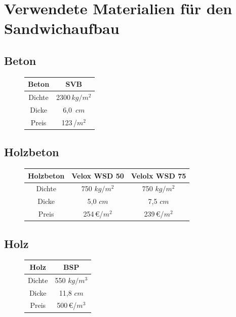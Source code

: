 \section{Verwendete Materialien für den Sandwichaufbau}

\subsection{Beton}

\begin{figure}[h!]
\begin{tabular}{|c|c|}
\hline 
Beton & SVB \\ 
\hline \hline
Dichte & 2300\,$ kg/m^{2}$ \\ 
\hline 
Dicke & 6,0\, $cm$ \\ 
\hline 
Preis & 123\,/$m^{2}$ \\ 
\hline 
\end{tabular} 
\end{figure}


\subsection{Holzbeton}

\begin{figure}[h!]
\begin{tabular}{|c|c|c|}
\hline 
Holzbeton & Velox WSD 50 & Velolx WSD 75 \\ 
\hline \hline
Dichte & 750 $ kg/m^{2}$ &750 $ kg/m^{2}$ \\ 
\hline 
Dicke & 5,0 $cm$ & 7,5 $cm$\\ 
\hline 
Preis & 254\,\euro/$m^{2}$ & 239\,\euro/$m^{2}$ \\ 
\hline 
\end{tabular} 
\end{figure}

\subsection{Holz}

\begin{figure}[h!]
\begin{tabular}{|c|c|}
\hline 
Holz & BSP \\ 
\hline \hline
Dichte & 550 $ kg/m^{3}$  \\ 
\hline 
Dicke & 11,8 $cm$ \\ 
\hline 
Preis & 500\,\euro/$m^{3}$\\ 
\hline 
\end{tabular} 
\end{figure}

